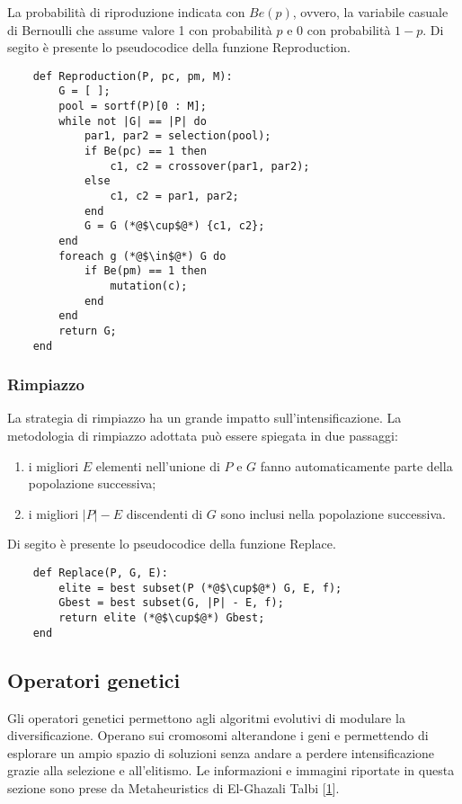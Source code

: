 La probabilità di riproduzione indicata con $Be(p)$, ovvero, la variabile casuale di Bernoulli che assume valore 1 con probabilità $p$ e 0 con probabilità $1-p$. Di segito è presente lo pseudocodice della funzione Reproduction.

\begin{lstlisting}
    def Reproduction(P, pc, pm, M):
        G = [ ];
        pool = sortf(P)[0 : M];
        while not |G| == |P| do
            par1, par2 = selection(pool);
            if Be(pc) == 1 then
                c1, c2 = crossover(par1, par2);
            else
                c1, c2 = par1, par2;
            end
            G = G (*@$\cup$@*) {c1, c2};
        end
        foreach g (*@$\in$@*) G do
            if Be(pm) == 1 then
                mutation(c);
            end
        end
        return G;
    end
\end{lstlisting}

\subsubsection{Rimpiazzo}
La strategia di rimpiazzo ha un grande impatto sull'intensificazione. La metodologia di rimpiazzo adottata può essere spiegata in due passaggi: 
\begin{enumerate}
    \item i migliori $E$ elementi nell'unione di $P$ e $G$ fanno automaticamente parte della popolazione successiva;
    \item i migliori $|P| - E$ discendenti di $G$ sono inclusi nella popolazione successiva.
\end{enumerate}

\noindent Di segito è presente lo pseudocodice della funzione Replace.

\begin{lstlisting}
    def Replace(P, G, E):
        elite = best subset(P (*@$\cup$@*) G, E, f);
        Gbest = best subset(G, |P| - E, f);
        return elite (*@$\cup$@*) Gbest;
    end
\end{lstlisting}

\subsection{Operatori genetici} \hypertarget{og}{}

Gli operatori genetici permettono agli algoritmi evolutivi di modulare la diversificazione. Operano sui cromosomi alterandone i geni e permettendo di esplorare un ampio spazio di soluzioni senza andare a perdere intensificazione grazie alla selezione e all'elitismo. Le informazioni e immagini riportate in questa sezione sono prese da Metaheuristics di El-Ghazali Talbi [\hyperlink{bibliografia}{1}].

